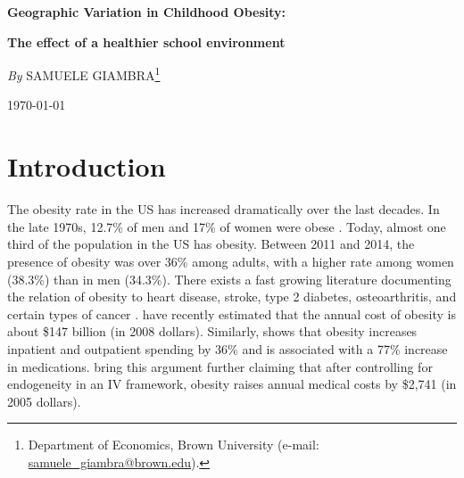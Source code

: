 \documentclass[twoside,12pt]{article}
\renewcommand*{\thefootnote}{\fnsymbol{footnote}}		%
\begin{document}
\thispagestyle{firststyle}

\centerline{\Large{\textbf{Geographic Variation in Childhood Obesity:}}} 
\vspace{2mm}
\centerline{\large{\textbf{The effect of a healthier school environment}}} 

\vspace{5mm}

\centerline{\textit{By} SAMUELE GIAMBRA\footnote{Department of Economics, Brown University (e-mail: \href{mailto:samuele_giambra@brown.edu}{samuele\_giambra@brown.edu}).}}
\vspace{2mm}
\centerline{\today}


\vspace{8mm}
\renewcommand*{\thefootnote}{\arabic{footnote}}		%
\setcounter{footnote}{0}




\section{Introduction}
The obesity rate in the US has increased dramatically over the last decades. In the late 1970s, 12.7\% of men and 17\% of women were obese \citep{eid2008fat}. Today, almost one third of the population in the US has obesity. Between 2011 and 2014, the presence of obesity was over 36\% among adults, with a higher rate among women (38.3\%) than in men (34.3\%). There exists a fast growing literature documenting the relation of obesity to heart disease, stroke, type 2 diabetes, osteoarthritis, and certain types of cancer \citep{nhlbi2013}. \cite{finkelstein2009annual} have recently estimated that the annual cost of obesity is about \$147 billion (in 2008 dollars). Similarly, \cite{sturm2002effects} shows that obesity increases inpatient and outpatient spending by 36\% and is associated with a 77\% increase in medications. \cite{cawley2012medical} bring this argument further claiming that after controlling for endogeneity in an IV framework, obesity raises annual medical costs by \$2,741 (in 2005 dollars).
\end{document}
